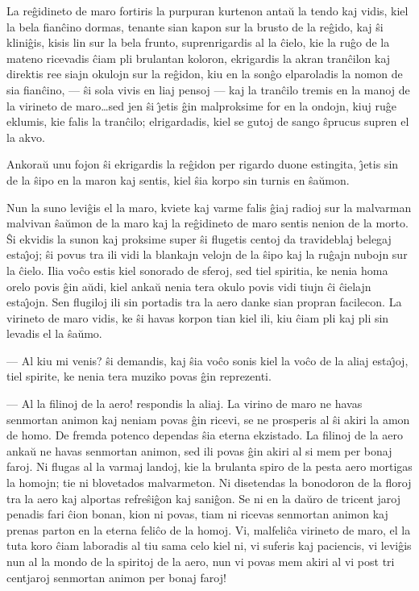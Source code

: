    La re\^gidineto de maro fortiris la purpuran kurtenon anta\u u la tendo
kaj vidis, kiel la bela fian\^cino dormas, tenante sian kapon sur la
brusto de la re\^gido, kaj \^si klini\^gis, kisis lin sur la bela
frunto, suprenrigardis al la \^cielo, kie la ru\^go de la mateno
ricevadis \^ciam pli brulantan koloron, ekrigardis la akran
tran\^cilon kaj direktis ree siajn okulojn sur la re\^gidon, kiu en
la son\^go elparoladis la nomon de sia fian\^cino, --- \^si sola
vivis en liaj pensoj --- kaj la tran\^cilo tremis en la manoj de la
virineto de maro\dots sed jen \^si \^{\j}etis \^gin malproksime for
en la ondojn, kiuj ru\^ge eklumis, kie falis la tran\^cilo;
elrigardadis, kiel se gutoj de sango \^sprucus supren el la akvo.

   Ankora\u u unu fojon \^si ekrigardis la re\^gidon per rigardo duone
estingita, \^{\j}etis sin de la \^sipo en la maron kaj sentis, kiel
\^sia korpo sin turnis en \^sa\u umon.

   Nun la suno levi\^gis el la maro, kviete kaj varme falis \^giaj radioj
sur la malvarman malvivan \^sa\u umon de la maro kaj la re\^gidineto
de maro sentis nenion de la morto. \^Si ekvidis la sunon kaj
proksime super \^si flugetis centoj da travideblaj belegaj
esta\^{\j}oj; \^si povus tra ili vidi la blankajn velojn de la
\^sipo kaj la ru\^gajn nubojn sur la \^cielo. Ilia vo\^co estis kiel
sonorado de sferoj, sed tiel spiritia, ke nenia homa orelo povis
\^gin a\u udi, kiel anka\u u nenia tera okulo povis vidi tiujn \^ci
\^cielajn esta\^{\j}ojn. Sen flugiloj ili sin portadis tra la aero
danke sian propran facilecon. La virineto de maro vidis, ke \^si
havas korpon tian kiel ili, kiu \^ciam pli kaj pli sin levadis el la
\^sa\u umo.

 --- Al kiu mi venis? \^si demandis, kaj \^sia vo\^co sonis kiel la vo\^co
de la aliaj esta\^{\j}oj, tiel spirite, ke nenia tera muziko povas
\^gin reprezenti.

 --- Al la filinoj de la aero! respondis la aliaj. La virino de maro
ne havas senmortan animon kaj neniam povas \^gin ricevi, se ne
prosperis al \^si akiri la amon de homo. De fremda potenco dependas
\^sia eterna ekzistado. La filinoj de la aero anka\u u ne havas
senmortan animon, sed ili povas \^gin akiri al si mem per bonaj
faroj. Ni flugas al la varmaj landoj, kie la brulanta spiro de la
pesta aero mortigas la homojn; tie ni blovetados malvarmeton. Ni
disetendas la bonodoron de la floroj tra la aero kaj alportas
refre\^si\^gon kaj sani\^gon. Se ni en la da\u uro de tricent jaroj
penadis fari \^cion bonan, kion ni povas, tiam ni ricevas senmortan
animon kaj prenas parton en la eterna feli\^co de la homoj. Vi,
malfeli\^ca virineto de maro, el la tuta koro \^ciam laboradis al
tiu sama celo kiel ni, vi suferis kaj paciencis, vi levi\^gis nun al
la mondo de la spiritoj de la aero, nun vi povas mem akiri al vi
post tri centjaroj senmortan animon per bonaj faroj!

